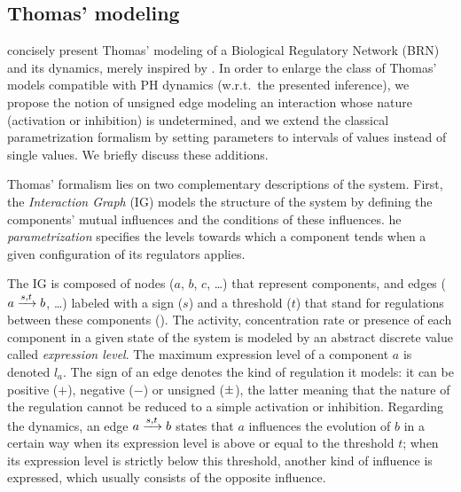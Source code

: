 \subsection{Thomas' modeling}
\label{ssec:thomas}



 concisely present Thomas' modeling of a Biological Regulatory Network (BRN) and its dynamics, merely inspired by
\cite{thomas1990biological, Richard06,BernotSemBRN}.
In order to enlarge the class of Thomas' models compatible with PH dynamics (w.r.t.~the presented
inference),
we propose the notion of unsigned edge modeling an interaction whose nature (activation or inhibition) is undetermined,
and we extend the classical parametrization formalism by setting parameters to intervals of values instead of single values.
We briefly discuss these additions.

\medskip

Thomas' formalism lies on two complementary descriptions of the system. First, the
\emph{Interaction Graph} (IG) models the structure of the system by defining the components'
mutual influences and the conditions of these influences. he \emph{parametrization}  specifies the levels towards which a component tends when a given configuration of its regulators applies.

The IG is composed of nodes ($a$, $b$, $c$, …) that represent components,
and edges ($a \xrightarrow{s, t} b$, …) labeled with a sign ($s$) and a threshold ($t$) that stand for regulations between these components ().
The activity, concentration rate or presence of each component in a given state of the system is modeled by an abstract discrete value called \emph{expression level}.
The maximum expression level of a component $a$ is denoted $l_a$.
The sign of an edge denotes the kind of regulation it models: it can be positive ($+$), negative ($-$) or unsigned ($\pm$),
the latter meaning that the nature of the regulation cannot be reduced to a simple activation or inhibition.
Regarding the dynamics, an edge $a \xrightarrow{s, t} b$ states that $a$ influences the evolution of $b$ in a certain way when its expression level is above or equal to the threshold $t$;
when its expression level is strictly below this threshold, another kind of influence is expressed, which usually consists of the opposite influence.

